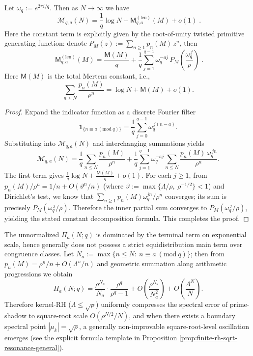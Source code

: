 \begin{theorem}\label{thm:zeta-length-modq-chebotarev-mertens}
Let \(\omega_q:=e^{2\pi i/q}\). Then as \(N\to\infty\) we have
\[
\boxed{\;
\mathcal{M}_{q,a}(N)=\frac{1}{q}\log N+\mathsf{M}^{(\mathrm{len})}_{q,a}(M)+o(1)\; }.
\]
Here the constant term is explicitly given by the root-of-unity twisted primitive generating function: denote
\(
P_M(z):=\sum_{n\ge1}p_n(M)\,z^n
\), then
\[
\boxed{\;
\mathsf{M}^{(\mathrm{len})}_{q,a}(M)
=\frac{\mathsf{M}(M)}{q}
+\frac{1}{q}\sum_{j=1}^{q-1}\omega_q^{-aj}\,P_M\!\left(\frac{\omega_q^{\,j}}{\rho}\right)\; }.
\]
Here \(\mathsf{M}(M)\) is the total Mertens constant, i.e.,
\[
\sum_{n\le N}\frac{p_n(M)}{\rho^n}=\log N+\mathsf{M}(M)+o(1).
\]
\end{theorem}
\begin{proof}
Expand the indicator function as a discrete Fourier filter
\[
\mathbf 1_{\{n\equiv a\ (\mathrm{mod}\ q)\}}
=\frac{1}{q}\sum_{j=0}^{q-1}\omega_q^{\,j(n-a)}.
\]
Substituting into \(\mathcal{M}_{q,a}(N)\) and interchanging summations yields
\[
\mathcal{M}_{q,a}(N)
=\frac{1}{q}\sum_{n\le N}\frac{p_n(M)}{\rho^n}
+\frac{1}{q}\sum_{j=1}^{q-1}\omega_q^{-aj}\sum_{n\le N}\frac{p_n(M)\,\omega_q^{\,jn}}{\rho^n}.
\]
The first term gives \(\frac{1}{q}\log N+\frac{\mathsf{M}(M)}{q}+o(1)\).
For each \(j\ge1\), from
\(
p_n(M)/\rho^n
=1/n+O(\vartheta^n/n)
\)
(where \(\vartheta:=\max\{\Lambda/\rho,\ \rho^{-1/2}\}<1\))
and Dirichlet's test, we know that \(\sum_{n\ge1}p_n(M)\omega_q^{jn}/\rho^n\) converges; its sum is precisely \(P_M(\omega_q^{\,j}/\rho)\).
Therefore the inner partial sum converges to \(P_M(\omega_q^{\,j}/\rho)\), yielding the stated constant decomposition formula. This completes the proof.
\end{proof}

\begin{remark}\label{rem:zeta-length-modq-raw-endpoint-bias}
The unnormalized \(\Pi_a(N;q)\) is dominated by the terminal term on exponential scale, hence generally does not possess a strict equidistribution main term over congruence classes.
Let \(N_a:=\max\{n\le N:\ n\equiv a\ (\mathrm{mod}\ q)\}\); then from
\(
p_n(M)=\rho^n/n+O(\Lambda^n/n)
\)
and geometric summation along arithmetic progressions we obtain
\[
\Pi_a(N;q)
=\frac{\rho^{N_a}}{N_a}\cdot\frac{\rho^q}{\rho^q-1}
+O\!\left(\frac{\rho^{N_a}}{N_a^2}\right)
+O\!\left(\frac{\Lambda^{N}}{N}\right).
\]
Therefore kernel-RH (\(\Lambda\le \sqrt{\rho}\)) uniformly compresses the spectral error of prime-shadow to square-root scale \(O(\rho^{N/2}/N)\), and when there exists a boundary spectral point \(|\mu_k|=\sqrt{\rho}\), a generally non-improvable square-root-level oscillation emerges (see the explicit formula template in Proposition \ref{prop:finite-rh-sqrt-resonance-general}).
\end{remark}

